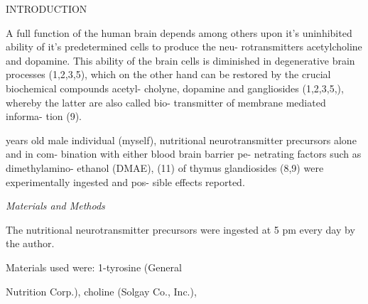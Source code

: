 \documentclass[10pt]{memoir}
\begin{document}
\begin{multicols}{2}

	\noindent INTRODUCTION

	\noindent A full function of the human brain depends\linebreak
	among others upon it's uninhibited ability of\linebreak
	it's predetermined cells to produce the neu-\linebreak
	rotransmitters acetylcholine and dopamine.\linebreak
	This ability of the brain cells is diminished\linebreak
	in degenerative brain processes (1,2,3,5),\linebreak
	which on the other hand can be restored by\linebreak
	the crucial biochemical compounds acetyl-\linebreak
	cholyne, dopamine and gangliosides (1,2,3,5,), whereby the latter are also called bio-\linebreak
	transmitter of membrane mediated informa-\linebreak
	tion (9).


	\columnbreak

	\noindent years old male individual (myself), nutritional\linebreak
	neurotransmitter precursors alone and in com-\linebreak
	bination with either blood brain barrier pe-\linebreak
	netrating factors such as dimethylamino-\linebreak
	ethanol (DMAE), (11) of thymus glandiosides\linebreak
	(8,9) were experimentally ingested and pos-\linebreak
	sible effects reported.

	\bigskip

	\noindent\textit{Materials and Methods}

	\bigskip

	\noindent The nutritional neurotransmitter precursors\linebreak
	were ingested at 5 pm every day by the\linebreak
	author.

	\bigskip

	\noindent Materials used were: 1-tyrosine (General\linebreak
	{Nutrition Corp.), choline (Solgay Co., Inc.),\parfillskip=0pt\par}

\end{multicols}
\end{document}
